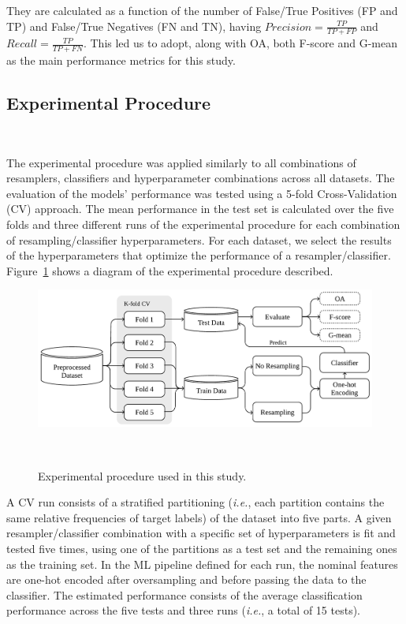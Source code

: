 \documentclass[preprint,12pt]{elsarticle}
\begin{document}
{They are calculated as a function of the number of False/True Positives (FP
and TP) and False/True Negatives (FN and TN), having $Precision =
\frac{TP}{TP+FP}$ and $Recall = \frac{TP}{TP+FN}$.  This led us to adopt,
along with OA, both F-score and G-mean as the main performance metrics for
this study. 

\subsection{Experimental Procedure}~\label{sec:experimental_procedure}

The experimental procedure was applied similarly to all combinations of
resamplers, classifiers and hyperparameter combinations across all datasets.
The evaluation of the models' performance was tested using a 5-fold
Cross-Validation (CV) approach. The mean performance in the test set is
calculated over the five folds and three different runs of the experimental
procedure for each combination of resampling/classifier hyperparameters. For
each dataset, we select the results of the hyperparameters that optimize the
performance of a resampler/classifier. Figure~\ref{fig:experimental_procedure}
shows a diagram of the experimental procedure described.

\begin{figure}
	\centering
	\includegraphics[width=.8\linewidth]{../analysis/experimental_procedure}
    \caption{Experimental procedure used in this study.
    }~\label{fig:experimental_procedure}
\end{figure}

A CV run consists of a stratified partitioning (\textit{i.e.}, each partition
contains the same relative frequencies of target labels) of the dataset into
five parts. A given resampler/classifier combination with a specific set of
hyperparameters is fit and tested five times, using one of the partitions as a
test set and the remaining ones as the training set. In the ML pipeline
defined for each run, the nominal features are one-hot encoded after
oversampling and before passing the data to the classifier. The estimated
performance consists of the average classification performance across the five
tests and three runs (\textit{i.e.}, a total of 15 tests). 

}
\end{document}
